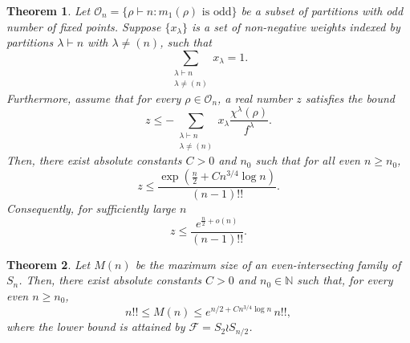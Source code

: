 \documentclass[10pt,a4paper]{amsart}
\newtheorem{theorem}{Theorem}
\begin{document}
\begin{theorem}\label{thm:z_upper_bound}
Let 
$
\mathcal{O}_n = \{ \rho \vdash n : m_1(\rho) \text{ is odd} \} 
$ be a subset of partitions with odd number of fixed points.
Suppose $\{x_\lambda\}$ is a set of non-negative weights indexed by partitions $\lambda \vdash n$ with $\lambda \neq (n)$, such that
$$
\sum_{\substack{\lambda \vdash n \\ \lambda \neq (n)}} x_\lambda = 1.
$$
Furthermore, assume that for every $\rho \in \mathcal{O}_n$, a real number $z$ satisfies the bound
$$
z \le -\sum_{\substack{\lambda \vdash n \\ \lambda \neq (n)}} x_\lambda \frac{\chi^\lambda(\rho)}{f^\lambda}.
$$
Then, there exist absolute constants $C>0$ and $n_0$ such that for all even $n \ge n_0$,
$$
z \le \frac{\exp{\left(\frac{n}{2}+Cn^{3/4}\log n\right)}}{(n-1)!!}.
$$
Consequently, for sufficiently large $n$
$$
z \le \frac{e^{\frac{n}{2}+o(n)}}{(n-1)!!}.
$$
\end{theorem}

\begin{theorem}\label{thm:main_result}
Let $M(n)$ be the maximum size of an even-intersecting family of $S_n$.
    Then, there exist absolute constants
$C>0$ and $n_0 \in \mathbb{N}$ such that, for every even $n\geq n_0$,
\begin{equation*}
n!!\leq M(n)
\leq e^{{n}/{2}+C n^{3/4}\log n}\,n!!,
\label{eq:main-even-intro}
\end{equation*}
where the lower bound is attained by $\mathcal{F}=S_2\wr S_{n/2}$.
\end{theorem}
\end{document}
